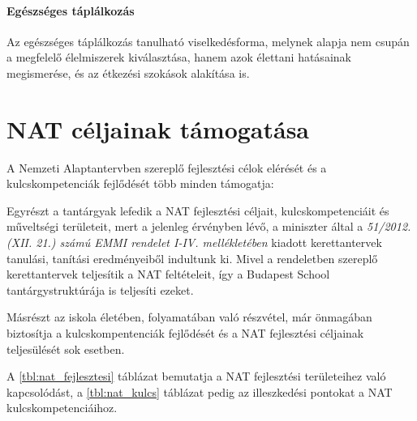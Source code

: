 \paragraph{Egészséges táplálkozás}

Az egészséges táplálkozás tanulható viselkedésforma, melynek alapja nem csupán a megfelelő élelmiszerek kiválasztása, hanem azok élettani hatásainak megismerése, és az étkezési szokások alakítása is.

\section{NAT céljainak támogatása}

A Nemzeti Alaptantervben szereplő fejlesztési célok elérését és a kulcskompetenciák fejlődését több minden támogatja:

Egyrészt a tantárgyak lefedik a NAT fejlesztési céljait, kulcskompetenciáit és műveltségi területeit, mert a jelenleg érvényben lévő, a miniszter által a \emph{51/2012. (XII. 21.) számú EMMI rendelet I-IV. mellékletében} kiadott kerettantervek \citep{ofi:kerettanterv} tanulási, tanítási eredményeiből indultunk ki. Mivel a rendeletben szereplő kerettantervek teljesítik a NAT feltételeit, így a Budapest School tantárgystruktúrája is teljesíti ezeket.

Másrészt az iskola életében, folyamatában való részvétel, már önmagában biztosítja a kulcskompentenciák fejlődését és a NAT fejlesztési céljainak teljesülését sok esetben.

A \ref{tbl:nat_fejlesztesi} táblázat bemutatja a NAT fejlesztési területeihez való kapcsolódást, a
\ref{tbl:nat_kulcs} táblázat pedig az illeszkedési pontokat a NAT kulcskompetenciáihoz.

